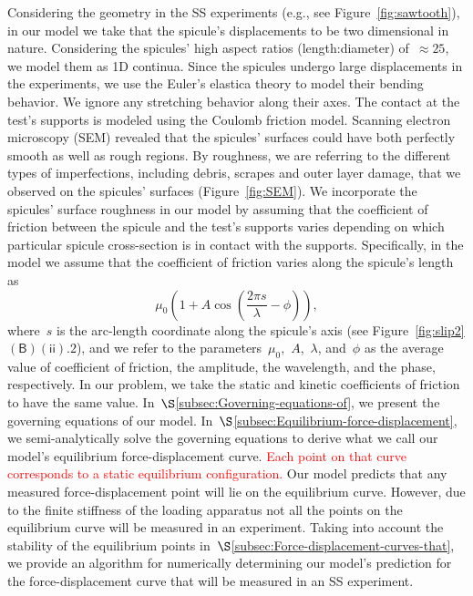 \documentclass[preprint,10pt,times]{elsarticle}
\numberwithin{equation}{section}
\newcommand{\pr}[1]{\left( #1 \right)}
\newcommand{\subf}[1]{\pr{\textsf{#1}}}
\begin{document}
Considering the geometry in the SS experiments\textcolor{violet}{{}
}(e.g., see Figure~\ref{fig:sawtooth}), in our model we take that
the spicule's displacements to be two dimensional in nature. Considering
the spicules' high aspect ratios (length:diameter) of~$\approx 25$,
we model them as 1D continua. Since the spicules undergo large displacements
in the experiments, we use the Euler's elastica theory to model their
bending behavior. We ignore any stretching behavior along their axes.
The contact at the test's supports is modeled using the Coulomb friction
model. Scanning electron microscopy (SEM) revealed that the spicules'
surfaces could have both perfectly smooth as well as rough regions.
By roughness, we are referring to the different types of imperfections,
including debris, scrapes and outer layer damage, that we observed
on the spicules' surfaces (Figure~\ref{fig:SEM}). We incorporate
the spicules' surface roughness in our model by assuming that the
coefficient of friction between the spicule and the test's supports
varies depending on which particular spicule cross-section is in contact
with the supports. Specifically, in the model we assume that the coefficient
of friction varies along the spicule's length  as
\begin{equation}
\mu_{0}\left(1+A\cos\left(\frac{ 2 \pi s}{\lambda}-\phi\right)\right),\label{eq:muofS1}
\end{equation}
where~$s$ is the arc-length coordinate along the spicule's axis
(see Figure~\ref{fig:slip2}$\subf{B}$$\subf{ii}.2$), and we refer
to the parameters~$\mu_0$,~$A$,~$\lambda$, and~$\phi$ as the
average value of coefficient of friction, the amplitude, the wavelength,
and the phase, respectively. In our problem, we take the static and
kinetic coefficients of friction to have the same value. In~$\S$\ref{subsec:Governing-equations-of},
we present the governing equations of our model. In~$\S$\ref{subsec:Equilibrium-force-displacement},
we semi-analytically solve the governing equations to derive what
we call our model's equilibrium force-displacement curve. \textcolor{red}{Each point on that curve corresponds to a static equilibrium configuration.}
Our model
predicts that any measured force-displacement point will lie on the
equilibrium curve. However, due to the finite stiffness of the loading
apparatus not all the points on the equilibrium curve will be measured
in an experiment. Taking into account the stability of the equilibrium
points in~$\S$\textcolor{violet}{\ref{subsec:Force-displacement-curves-that}},
we provide an algorithm for numerically determining our model's prediction
for the force-displacement curve that will be measured in an SS experiment.
\end{document}
